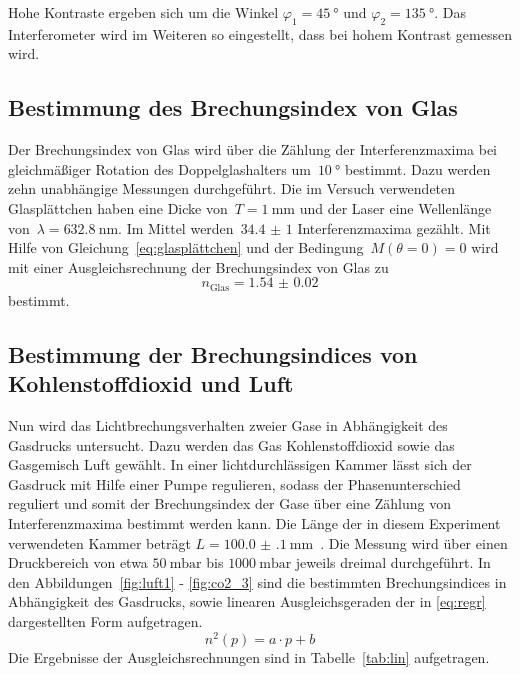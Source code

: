 Hohe Kontraste ergeben sich um die Winkel $\varphi_1=\SI{45}{\degree}$ und
$\varphi_2=\SI{135}{\degree}$. Das Interferometer wird im Weiteren so
eingestellt, dass bei hohem Kontrast gemessen wird.

\subsection{Bestimmung des Brechungsindex von Glas}
Der Brechungsindex von Glas wird über die Zählung der Interferenzmaxima bei
gleichmäßiger Rotation des Doppelglashalters um~$\SI{10}{\degree}$ bestimmt.
Dazu werden zehn unabhängige Messungen durchgeführt. Die im Versuch verwendeten
Glasplättchen haben eine Dicke von~$T=\SI{1}{\milli\meter}$ und der Laser eine
Wellenlänge von~$\lambda=\SI{632.8}{\nano\meter}$. Im Mittel
werden~$\num{34.4(10)}$ Interferenzmaxima gezählt. Mit Hilfe von
Gleichung~\eqref{eq:glasplättchen} und der Bedingung~$M(\theta=0)=0$ wird mit
einer Ausgleichsrechnung der Brechungsindex von Glas zu
\begin{equation}
  n_{\text{Glas}}=\num{1.54(2)}
  \label{eq:glas}
\end{equation}
bestimmt.

\subsection{Bestimmung der Brechungsindices von Kohlenstoffdioxid und Luft}
Nun wird das Lichtbrechungsverhalten zweier Gase in Abhängigkeit des Gasdrucks
untersucht. Dazu werden das Gas Kohlenstoffdioxid sowie das Gasgemisch Luft
gewählt. In einer lichtdurchlässigen Kammer lässt sich der Gasdruck mit Hilfe
einer Pumpe regulieren, sodass der Phasenunterschied reguliert und somit der
Brechungsindex der Gase über eine Zählung von Interferenzmaxima bestimmt werden
kann. Die Länge der in diesem Experiment verwendeten Kammer beträgt
$L=\SI{100.0(1)}{\milli\meter}$~\cite{V64}. Die Messung wird über einen
Druckbereich von etwa $\SI{50}{\milli\bar}$ bis $\SI{1000}{\milli\bar}$ jeweils
dreimal durchgeführt. In den Abbildungen~\ref{fig:luft1} - \ref{fig:co2_3} sind
die bestimmten Brechungsindices in Abhängigkeit des Gasdrucks, sowie linearen
Ausgleichsgeraden der in \eqref{eq:regr} dargestellten Form aufgetragen.
%
\begin{equation}
  n^2(p)=a\cdot p + b
  \label{eq:regr}
\end{equation}
%
Die Ergebnisse der Ausgleichsrechnungen sind in Tabelle~\ref{tab:lin} aufgetragen.


